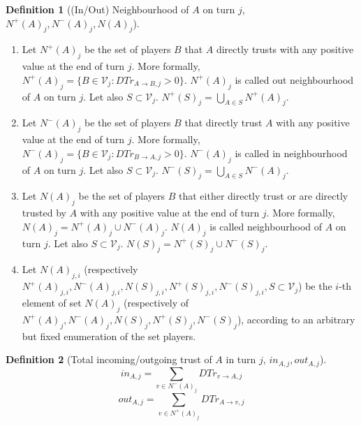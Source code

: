 \documentclass[11pt]{article}
\theoremstyle{definition}
\newtheorem{definition}{Definition}[section]
\theoremstyle{corollary}
\theoremstyle{lemma}
\begin{document}
     \begin{definition}[(In/Out) Neighbourhood of $A$ on turn $j$, $N^{+}(A)_j, N^{-}(A)_j, N(A)_j$] \ 
        \begin{enumerate}
           \item Let $N^{+}(A)_j$ be the set of players $B$ that $A$ directly trusts with any positive value at the end of
              turn $j$. More formally, $N^{+}(A)_j = \{B \in \mathcal{V}_j : DTr_{A \rightarrow B, j} > 0\}$. $N^{+}(A)_j$
              is called out neighbourhood of $A$ on turn $j$. Let also $S \subset \mathcal{V}_j$. $N^{+}(S)_j =
              \bigcup\limits_{A \in S}N^{+}(A)_j$.
           \item Let $N^{-}(A)_j$ be the set of players $B$ that directly trust $A$ with any positive value at the end of
              turn $j$. More formally, $N^{-}(A)_j = \{B \in \mathcal{V}_j : DTr_{B \rightarrow A, j} > 0\}$. $N^{-}(A)_j$
              is called in neighbourhood of $A$ on turn $j$. Let also $S \subset \mathcal{V}_j$. $N^{-}(S)_j =
              \bigcup\limits_{A \in S}N^{-}(A)_j$.
           \item Let $N(A)_j$ be the set of players $B$ that either directly trust or are directly trusted by $A$ with
              any positive value at the end of turn $j$. More formally, $N(A)_j = N^{+}(A)_j \cup N^{-}(A)_j$. $N(A)_j$ is
              called neighbourhood of $A$ on turn $j$. Let also $S \subset \mathcal{V}_j$.
              $N(S)_j = N^{+}(S)_j \cup N^{-}(S)_j$.
           \item Let $N(A)_{j,i}$ (respectively $N^{+}(A)_{j,i}, N^{-}(A)_{j,i}, N(S)_{j,i}, N^{+}(S)_{j,i}, N^{-}(S)_{j,i},
              S \subset \mathcal{V}_j$) be the $i$-th element of set $N(A)_j$ (respectively of $N^{+}(A)_j, N^{-}(A)_j,
              N(S)_j, N^{+}(S)_j, N^{-}(S)_j$), according to an arbitrary but fixed enumeration of the set players.
        \end{enumerate}
     \end{definition}
     \begin{definition}[Total incoming/outgoing trust of $A$ in turn $j$, $in_{A, j}, out_{A, j}$] \ \\
        $$in_{A, j} = \sum\limits_{v \in N^{-}(A)_j}DTr_{v \rightarrow A, j}$$
        $$out_{A, j} = \sum\limits_{v \in N^{+}(A)_j}DTr_{A \rightarrow v, j}$$
     \end{definition}
\end{document}
